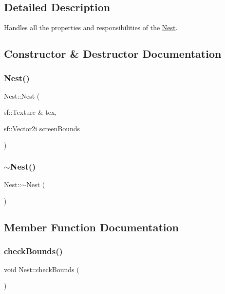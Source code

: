 \subsection{Detailed Description}
Handles all the properties and responsibilities of the \hyperlink{class_nest}{Nest}. 



\subsection{Constructor \& Destructor Documentation}
\mbox{\label{class_nest_af88d2bfa6f9d0b0c48982ff54fe31cf9}} 
\subsubsection{\texorpdfstring{Nest()}{Nest()}}
{\footnotesize\ttfamily Nest\+::\+Nest (\begin{DoxyParamCaption}\item[{sf\+::\+Texture \&}]{tex,  }\item[{sf\+::\+Vector2i}]{screen\+Bounds }\end{DoxyParamCaption})}

\mbox{\label{class_nest_a3e879ba15acd31717b1dc9bdc87488d5}} 
\subsubsection{\texorpdfstring{$\sim$\+Nest()}{~Nest()}}
{\footnotesize\ttfamily Nest\+::$\sim$\+Nest (\begin{DoxyParamCaption}{ }\end{DoxyParamCaption})}



\subsection{Member Function Documentation}
\mbox{\label{class_nest_ad3c58a10bcb55df97a6d0e7923924f0b}} 
\subsubsection{\texorpdfstring{check\+Bounds()}{checkBounds()}}
{\footnotesize\ttfamily void Nest\+::check\+Bounds (\begin{DoxyParamCaption}{ }\end{DoxyParamCaption})}

